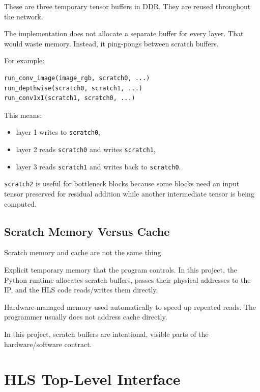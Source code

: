 \documentclass[11pt]{article}
\newcommand{\code}[1]{\texttt{#1}}
\begin{document}
These are three temporary tensor buffers in DDR.
They are reused throughout the network.

The implementation does not allocate a separate buffer for every layer.
That would waste memory.
Instead, it ping-pongs between scratch buffers.

For example:

\begin{lstlisting}
run_conv_image(image_rgb, scratch0, ...)
run_depthwise(scratch0, scratch1, ...)
run_conv1x1(scratch1, scratch0, ...)
\end{lstlisting}

This means:

\begin{itemize}[leftmargin=1.4em]
  \item layer 1 writes to \code{scratch0},
  \item layer 2 reads \code{scratch0} and writes \code{scratch1},
  \item layer 3 reads \code{scratch1} and writes back to \code{scratch0}.
\end{itemize}

\code{scratch2} is useful for bottleneck blocks because some blocks need an input tensor preserved for residual addition while another intermediate tensor is being computed.

\subsection{Scratch Memory Versus Cache}

Scratch memory and cache are not the same thing.

\begin{description}[leftmargin=2.8em,style=nextline]
  \item[Scratch memory]
  Explicit temporary memory that the program controls.
  In this project, the Python runtime allocates scratch buffers, passes their physical addresses to the IP, and the HLS code reads/writes them directly.

  \item[Cache]
  Hardware-managed memory used automatically to speed up repeated reads.
  The programmer usually does not address cache directly.
\end{description}

In this project, scratch buffers are intentional, visible parts of the hardware/software contract.

\section{HLS Top-Level Interface}
\end{document}
